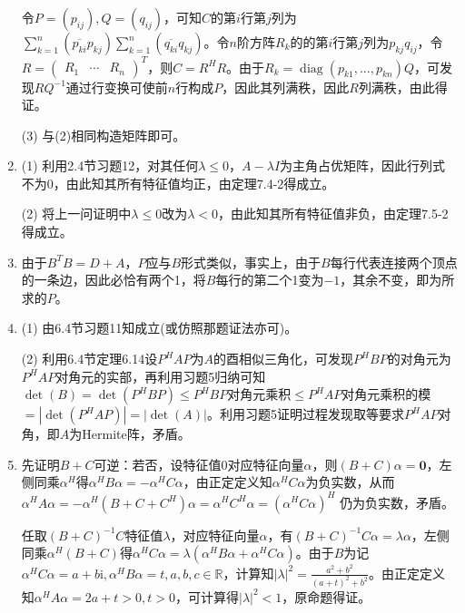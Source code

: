 \documentclass[a4paper,UTF8,fontset=windows]{ctexart}
\DeclareMathOperator{\diag}{diag}
\begin{document}
\begin{enumerate}
令$P=(p_{ij}),Q=(q_{ij})$，可知$C$的第$i$行第$j$列为$\sum_{k=1}^{n}(\overline{p_{ki}}p_{kj})\sum_{k=1}^{n}(\overline{q_{ki}}q_{kj})$。令$n$阶方阵$R_k$的的第$i$行第$j$列为$p_{kj}q_{ij}$，令$R=\begin{pmatrix}R_1&\cdots&R_n\end{pmatrix}^T$，则$C=R^HR$。由于$R_k=\diag(p_{k1},\ldots,p_{kn})Q$，可发现$RQ^{-1}$通过行变换可使前$n$行构成$P$，因此其列满秩，因此$R$列满秩，由此得证。

(3) 与(2)相同构造矩阵即可。

\item
(1) 利用2.4节习题12，对其任何$\lambda\le0$，$A-\lambda I$为主角占优矩阵，因此行列式不为0，由此知其所有特征值均正，由定理7.4-2得成立。

(2) 将上一问证明中$\lambda\le0$改为$\lambda<0$，由此知其所有特征值非负，由定理7.5-2得成立。

\item
由于$B^TB=D+A$，$P$应与$B$形式类似，事实上，由于$B$每行代表连接两个顶点的一条边，因此必恰有两个1，将$B$每行的第二个1变为$-1$，其余不变，即为所求的$P$。

\item
(1) 由6.4节习题11知成立(或仿照那题证法亦可)。

(2) 利用6.4节定理6.14设$P^HAP$为$A$的酉相似三角化，可发现$P^HBP$的对角元为$P^HAP$对角元的实部，再利用习题5归纳可知$\det(B)=\det(P^HBP)\le P^HBP$对角元乘积$\le P^HAP$对角元乘积的模$=|\det(P^HAP)|=|\det(A)|$。利用习题5证明过程发现取等要求$P^HAP$对角，即$A$为Hermite阵，矛盾。

\item
先证明$B+C$可逆：若否，设特征值0对应特征向量$\alpha$，则$(B+C)\alpha=\mathbf{0}$，左侧同乘$\alpha^H$得$\alpha^HB\alpha=-\alpha^HC\alpha$，由正定定义知$\alpha^HC\alpha$为负实数，从而$\alpha^HA\alpha=-\alpha^H(B+C+C^H)\alpha=\alpha^HC^H\alpha=(\alpha^HC\alpha)^H$ 仍为负实数，矛盾。

任取$(B+C)^{-1}C$特征值$\lambda$，对应特征向量$\alpha$，有$(B+C)^{-1}C\alpha=\lambda\alpha$，左侧同乘$\alpha^H(B+C)$得$\alpha^HC\alpha=\lambda(\alpha^HB\alpha+\alpha^HC\alpha)$。由于$B$为记$\alpha^HC\alpha=a+b\mathrm{i},\alpha^HB\alpha=t,a,b,c\in\mathbb{R}$，计算知$|\lambda|^2=\frac{a^2+b^2}{(a+t)^2+b^2}$。由正定定义知$\alpha^HA\alpha=2a+t>0,t>0$，可计算得$|\lambda|^2<1$，原命题得证。
\end{enumerate}
\end{document}
